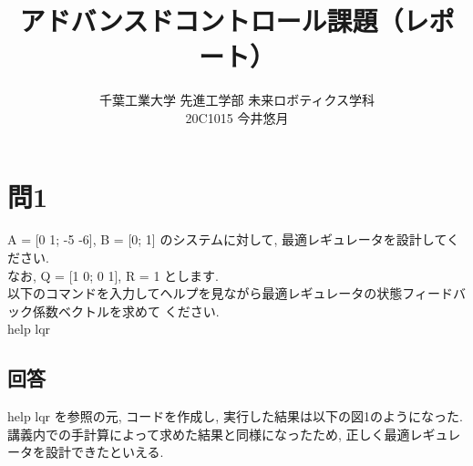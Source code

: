 \documentclass{jsarticle}
\begin{document}
\title{{\vspace*{-30mm}}{\LARGE アドバンスドコントロール課題（レポート）}}
\author{\large 千葉工業大学 先進工学部 未来ロボティクス学科 \vspace*{4mm}\\20C1015 今井悠月}
\date{}
\maketitle\vspace*{10mm}

\section*{問1}
A = [0 1; -5 -6], \hspace*{0.5zw}B = [0; 1] のシステムに対して, 最適レギュレータを設計してください.\\
\hspace*{1zw}なお, Q = [1 0; 0 1], \hspace*{0.5zw}R = 1 とします.\\
\hspace*{1zw}以下のコマンドを入力してヘルプを見ながら最適レギュレータの状態フィードバック係数ベクトルを求めて
\hspace*{1zw}ください.\vspace*{2mm}\\
\hspace*{1zw}help lqr\\

\vspace*{4mm}\subsection*{回答}
help lqr を参照の元, コードを作成し, 実行した結果は以下の図1のようになった.\\
\hspace*{1zw}講義内での手計算によって求めた結果と同様になったため, 正しく最適レギュレータを設計できたといえる.\\
\end{document}

